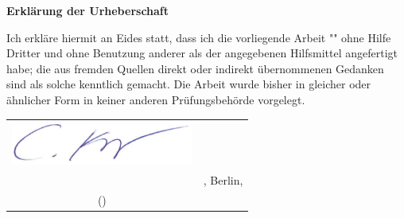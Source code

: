 \thispagestyle{plain} %

{\huge\textbf{Erklärung der Urheberschaft}}
\vspace{1cm}


\Large

Ich erkläre hiermit an Eides statt, dass ich die vorliegende Arbeit "\ttitle" ohne Hilfe
Dritter und ohne Benutzung anderer als der angegebenen Hilfsmittel angefertigt habe;
die aus fremden Quellen direkt oder indirekt übernommenen Gedanken sind als solche
kenntlich gemacht.
Die Arbeit wurde bisher in gleicher oder ähnlicher Form in keiner
anderen Prüfungsbehörde vorgelegt.


\vspace{1cm}
\begin{flushright}
\begin{tabular}{@{} c@{} c}
	\vspace*{-1.5em} \hspace*{1em}
	\includegraphics[width=6cm]{Pictures/Signature}&\\
	\makebox[8cm]{\dotfill} &, Berlin, \submissionDate\\
	(\authorname) & 
\end{tabular}
\end{flushright}
\newpage
